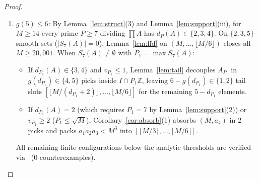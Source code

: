 \documentclass[11pt]{article}
\begin{document}
\begin{proof}
\begin{enumerate}
\begin{itemize}
\item If $P_1^2 \mid a$ for some $a \in A_{P_1}$, then $P_1 \le \sqrt{M}$ and every prime dividing $\prod A$ lies in $[2, \sqrt{M}]$; absorbing $(M, a_3)$ via Corollary~\ref{cor:absorb}(1) and packing $a_1 a_2 < M^2$ into $[\lfloor M / 3 \rfloor, \lfloor M / 4 \rfloor, \lfloor M / 5 \rfloor]$ closes all $M \ge 7{,}345$ (and finite verification checks $M \le 7{,}344$~\cite{bergstrom26smallcode}).
\end{itemize}
\item \emph{$g(5) \le 6$:} By Lemma~\ref{lem:struct}(3) and Lemma~\ref{lem:support}(iii), for $M \ge 14$ every prime $P \ge 7$ dividing $\prod A$ has $d_P(A) \in \{2, 3, 4\}$. On $\{2, 3, 5\}$-smooth sets ($|S_7(A)| = 0$), Lemma~\ref{lem:ffd} on $(M, \dots, \lfloor M / 6 \rfloor)$ closes all $M \ge 20{,}001$. When $S_7(A) \neq \emptyset$ with $P_1 = \max S_7(A)$:
\begin{itemize}
\item If $d_{P_1}(A) \in \{3, 4\}$ and $v_{P_1} \le 1$, Lemma~\ref{lem:tail} decouples $A_{P_1}$ in $g(d_{P_1}) \in \{4, 5\}$ picks inside $I \cap P_1 \mathbb{Z}$, leaving $6 - g(d_{P_1}) \in \{1, 2\}$ tail slots $[\lfloor M / (d_{P_1} + 2) \rfloor, \dots, \lfloor M / 6 \rfloor]$ for the remaining $5 - d_{P_1}$ elements.
\item If $d_{P_1}(A) = 2$ (which requires $P_1 = 7$ by Lemma~\ref{lem:support}(2)) or $v_{P_1} \ge 2$ ($P_1 \le \sqrt{M}$), Corollary~\ref{cor:absorb}(1) absorbs $(M, a_4)$ in $2$ picks and packs $a_1 a_2 a_3 < M^3$ into $[\lfloor M / 3 \rfloor, \dots, \lfloor M / 6 \rfloor]$.
\end{itemize}
All remaining finite configurations below the analytic thresholds are verified via~\cite{bergstrom26smallcode} ($0$ counterexamples).
\end{enumerate}
\end{proof}
\end{document}
